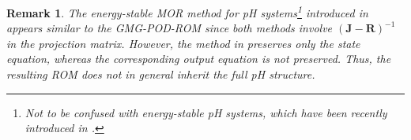\documentclass{article}
\newtheorem{remark}[theorem]{Remark}
\newcommand{\bmJ}{\bm{J}}
\newcommand{\bmR}{\bm{R}}
\newcommand{\pH}{\textsf{pH}\xspace}
\newcommand{\GMG}{\textsf{GMG}\xspace}
\newcommand{\POD}{\textsf{POD}\xspace}
\newcommand{\ROM}{\textsf{ROM}\xspace}
\newcommand{\MOR}{\textsf{MOR}\xspace}
\begin{document}
\begin{remark}
 The energy-stable \MOR method for \pH systems\footnote{Not to be confused with energy-stable \pH systems, which have been recently introduced in \cite{BUCHFINK2026109784}.} introduced in \cite{Rettberg31122023} appears similar to the \GMG-\POD-\ROM since both methods involve $(\bmJ-\bmR)^{-1}$ in the projection matrix. However, the method in \cite{Rettberg31122023} preserves only the state equation, whereas the corresponding output equation is not preserved. Thus, the resulting \ROM does not in general inherit the full \pH structure.  
\end{remark}

\end{document}

